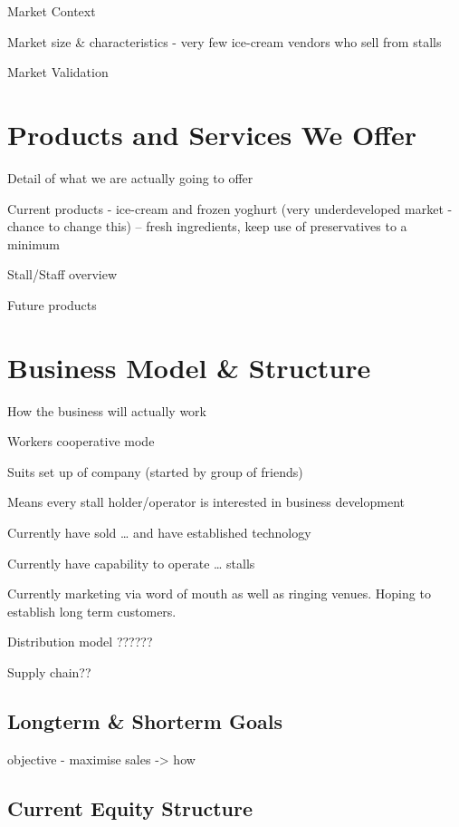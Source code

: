 \documentclass{article}
\begin{document}
  Market Context

  Market size \& characteristics - very few ice-cream vendors who sell from stalls

  Market Validation


\section{Products and Services We Offer}
  Detail of what we are actually going to offer

  Current products - ice-cream and frozen yoghurt (very underdeveloped market - chance to change this)
    -- fresh ingredients, keep use of preservatives to a minimum

  Stall/Staff overview

  Future products



\section{Business Model \& Structure}
  How the business will actually work

Workers cooperative mode

Suits set up of company (started by group of friends)

Means every stall holder/operator is interested in business development

Currently have sold … and have established technology

Currently have capability to operate … stalls

Currently marketing via word of mouth as well as ringing venues.
Hoping to establish long term customers.

Distribution model ??????

Supply chain??

  \subsection{Longterm \& Shorterm Goals}

    objective - maximise sales -> how


  \subsection{Current Equity Structure}
\end{document}
